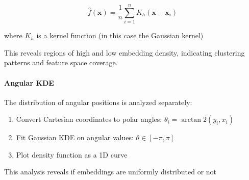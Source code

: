 \[
\hat{f}(\mathbf{x}) = \frac{1}{n} \sum_{i=1}^{n} K_h(\mathbf{x} - \mathbf{x}_i)
\]

where $K_h$ is a kernel function (in this case the Gaussian kernel) 


This reveals regions of high and low embedding density, indicating clustering patterns and feature space coverage.

\paragraph{Angular KDE}

The distribution of angular positions is analyzed separately:
\begin{enumerate}
    \item Convert Cartesian coordinates to polar angles: $\theta_i = \arctan2(y_i, x_i)$
    \item Fit Gaussian KDE on angular values: $\theta \in [-\pi, \pi]$
    \item Plot density function as a 1D curve
\end{enumerate}

This analysis reveals if embeddings are uniformly distributed or not




